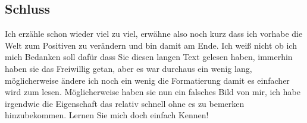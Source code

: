 \documentclass{scrartcl}
\begin{document}
\subsection*{Schluss}

Ich erzähle schon wieder viel zu viel, erwähne also noch kurz dass ich vorhabe die Welt zum
Positiven zu verändern und bin damit am Ende. Ich weiß nicht ob ich mich Bedanken soll dafür
dass Sie diesen langen Text gelesen haben, immerhin haben sie das Freiwillig getan, aber es
war durchaus ein wenig lang, möglicherweise ändere ich noch ein wenig die Formatierung damit
es einfacher wird zum lesen. Möglicherweise haben sie nun ein falsches Bild von mir, ich
habe irgendwie die Eigenschaft das relativ schnell ohne es zu bemerken hinzubekommen.
Lernen Sie mich doch einfach Kennen!



\end{document}
